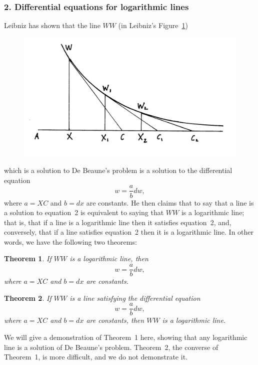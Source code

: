 \documentclass[polutonikogreek,english,twoside,openright]{article}
\newtheorem{theorem}{Theorem}
\begin{document}
\subsubsection*{2. Differential equations for logarithmic lines}

Leibniz has shown that the line $WW$ (in Leibniz's Figure~\ref{debeaune2})
\begin{figure}[htp]
\begin{center}
\includegraphics[width=.85\textwidth]{fig/Figure26A}
\caption{}
\label{debeaune2}
\vspace{-10pt}
\end{center}
\end{figure} 
which is a solution to De Beaune's problem is a solution to the differential equation
\begin{equation}
w = \frac{a}{b}dw,
\end{equation}
where $a = XC$ and $b= dx$ are constants.  He then claims that to say
that a line is a solution to equation~2 is equivalent to saying that
$WW$ is a logarithmic line; that is, that if a line is a logarithmic
line then it satisfies equation~2, and, conversely, that if a line
satisfies equation~2 then it is a logarithmic line.  In other words,
we have the following two theorems:

\begin{theorem}
If $WW$ is a logarithmic line, then
$$w= \frac{a}{b}dw,$$
where $a = XC$ and $b= dx$ are constants.
\end{theorem}

\begin{theorem}
If $WW$ is a line satisfying the differential equation
$$w=\frac{a}{b}dw,$$
where $a = XC$ and $b= dx$ are constants,
then $WW$ is a logarithmic line.
\end{theorem}

We will give a demonstration of Theorem~1 here, showing that any
logarithmic line is a solution of De Beaune's problem.  Theorem~2, the
converse of Theorem~1, is more difficult, and we do not demonstrate
it.  \vspace{\baselineskip}
\end{document}

